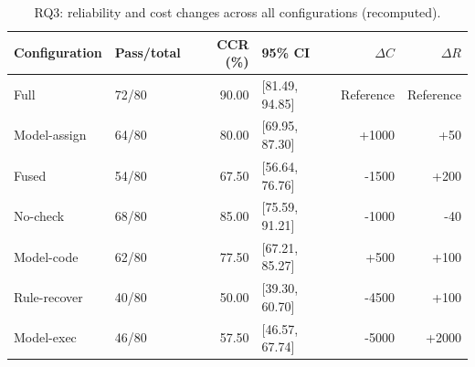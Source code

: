\begin{table}[!htbp]
\centering
\caption{RQ3: reliability and cost changes across all configurations (recomputed).}
\label{tab:rq3-main}
\footnotesize\setlength{\tabcolsep}{3pt}
\begin{tabular*}{\linewidth}{@{\extracolsep{\fill}}llrlrr@{}}
\toprule
Configuration & Pass/total & CCR (\%) & 95\% CI & $\Delta C$ & $\Delta R$ \\
\midrule
Full & 72/80 & 90.00 & [81.49, 94.85] & Reference & Reference \\
Model-assign & 64/80 & 80.00 & [69.95, 87.30] & +1000 & +50 \\
Fused & 54/80 & 67.50 & [56.64, 76.76] & -1500 & +200 \\
No-check & 68/80 & 85.00 & [75.59, 91.21] & -1000 & -40 \\
Model-code & 62/80 & 77.50 & [67.21, 85.27] & +500 & +100 \\
Rule-recover & 40/80 & 50.00 & [39.30, 60.70] & -4500 & +100 \\
Model-exec & 46/80 & 57.50 & [46.57, 67.74] & -5000 & +2000 \\
\bottomrule
\end{tabular*}
\end{table}
